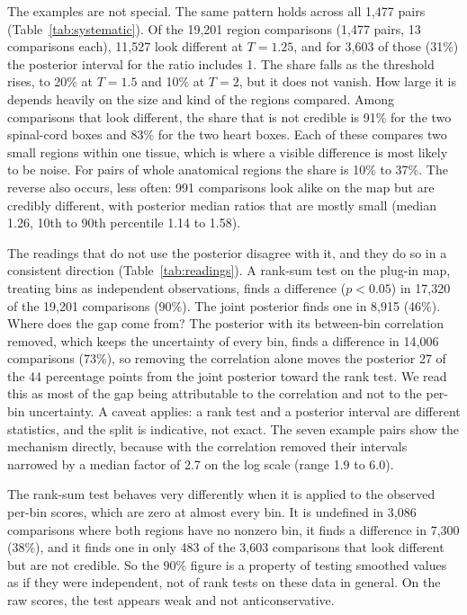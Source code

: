 \documentclass[10pt,letterpaper]{article}
\begin{document}
The examples are not special. The same pattern holds across all 1,477 pairs (Table~\ref{tab:systematic}). Of the 19,201 region comparisons (1,477 pairs, 13 comparisons each), 11,527 look different at $T = 1.25$, and for 3,603 of those (31\%) the posterior interval for the ratio includes 1. The share falls as the threshold rises, to 20\% at $T = 1.5$ and 10\% at $T = 2$, but it does not vanish. How large it is depends heavily on the size and kind of the regions compared. Among comparisons that look different, the share that is not credible is 91\% for the two spinal-cord boxes and 83\% for the two heart boxes. Each of these compares two small regions within one tissue, which is where a visible difference is most likely to be noise. For pairs of whole anatomical regions the share is 10\% to 37\%. The reverse also occurs, less often: 991 comparisons look alike on the map but are credibly different, with posterior median ratios that are mostly small (median 1.26, 10th to 90th percentile 1.14 to 1.58).

The readings that do not use the posterior disagree with it, and they do so in a consistent direction (Table~\ref{tab:readings}). A rank-sum test on the plug-in map, treating bins as independent observations, finds a difference ($p < 0.05$) in 17,320 of the 19,201 comparisons (90\%). The joint posterior finds one in 8,915 (46\%). Where does the gap come from? The posterior with its between-bin correlation removed, which keeps the uncertainty of every bin, finds a difference in 14,006 comparisons (73\%), so removing the correlation alone moves the posterior 27 of the 44 percentage points from the joint posterior toward the rank test. We read this as most of the gap being attributable to the correlation and not to the per-bin uncertainty. A caveat applies: a rank test and a posterior interval are different statistics, and the split is indicative, not exact. The seven example pairs show the mechanism directly, because with the correlation removed their intervals narrowed by a median factor of 2.7 on the log scale (range 1.9 to 6.0).

The rank-sum test behaves very differently when it is applied to the observed per-bin scores, which are zero at almost every bin. It is undefined in 3,086 comparisons where both regions have no nonzero bin, it finds a difference in 7,300 (38\%), and it finds one in only 483 of the 3,603 comparisons that look different but are not credible. So the 90\% figure is a property of testing smoothed values as if they were independent, not of rank tests on these data in general. On the raw scores, the test appears weak and not anticonservative.
\end{document}
